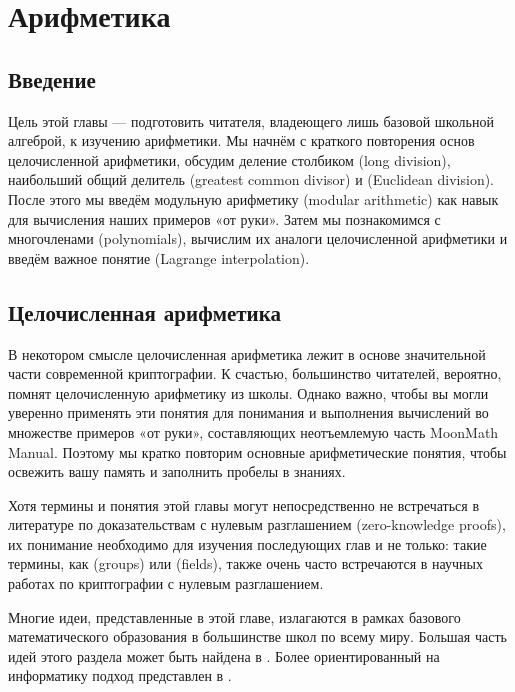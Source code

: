 \chapter{Арифметика}\label{chap:arithmetic}\label{chap:arithmetics}

\section{Введение}

Цель этой главы — подготовить читателя, владеющего лишь базовой школьной алгеброй, к изучению арифметики. Мы начнём с краткого повторения основ целочисленной арифметики, обсудим деление столбиком (long division), наибольший общий делитель (greatest common divisor) и  (Euclidean division). После этого мы введём модульную арифметику (modular arithmetic) как  навык для вычисления наших примеров «от руки». Затем мы познакомимся с многочленами (polynomials), вычислим их аналоги целочисленной арифметики и введём важное понятие  (Lagrange interpolation).

\section{Целочисленная арифметика}
\label{integer_arithmetic}
В некотором смысле целочисленная арифметика лежит в основе значительной части современной криптографии. К счастью, большинство читателей, вероятно, помнят целочисленную арифметику из школы. Однако важно, чтобы вы могли уверенно применять эти понятия для понимания и выполнения вычислений во множестве примеров «от руки», составляющих неотъемлемую часть MoonMath Manual. Поэтому мы кратко повторим основные арифметические понятия, чтобы освежить вашу память и заполнить пробелы в знаниях.

Хотя термины и понятия этой главы могут непосредственно не встречаться в литературе по доказательствам с нулевым разглашением (zero-knowledge proofs), их понимание необходимо для изучения последующих глав и не только: такие термины, как  (groups) или  (fields), также очень часто встречаются в научных работах по криптографии с нулевым разглашением.

Многие идеи, представленные в этой главе, излагаются в рамках базового математического образования в большинстве школ по всему миру. Большая часть идей этого раздела может быть найдена в \cite{wu-1}. Более ориентированный на информатику подход представлен в \cite{mignotte-1992}.

